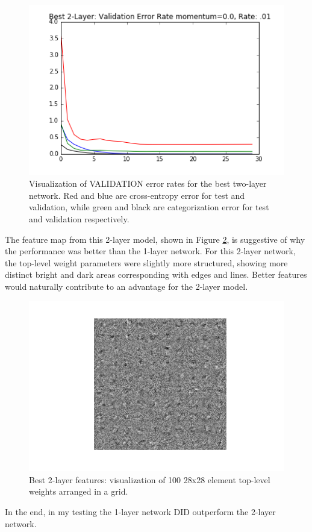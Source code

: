 \documentclass{article}
\begin{document}
\begin{figure}[h]
  \centering
  \includegraphics[scale=0.6]{../two_layer_best.png} 
  \caption{Visualization of VALIDATION error rates for the best two-layer network. Red and blue are cross-entropy error for test and validation, while green and black are categorization error for test and validation respectively. }
  \label{fig:twolayerbest}
\end{figure}

The feature map from this 2-layer model, shown in Figure \ref{fig:twolayerbestfeatures}, is suggestive of why the performance was better than the 1-layer network. For this 2-layer network, the top-level weight parameters were slightly more structured, showing more distinct bright and dark areas corresponding with edges and lines. Better features would naturally contribute to an advantage for the 2-layer model. 

\begin{figure}[h]
  \centering
  \includegraphics[scale=0.6]{../two_layer_best_features.png} 
  \caption{Best 2-layer features: visualization of 100 28x28 element top-level weights arranged in a grid. }
  \label{fig:twolayerbestfeatures}
\end{figure}

In the end, in my testing the 1-layer network DID outperform the 2-layer network. 
\end{document}

